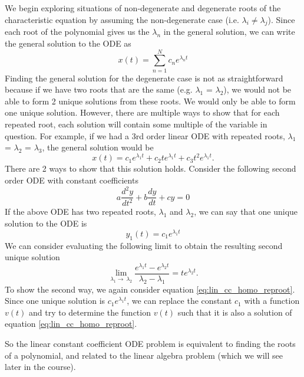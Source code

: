 \documentclass{article}
\newcommand{\be}{\begin{equation}}
\newcommand{\ee}{\end{equation}}
\begin{document}
We begin exploring situations of non-degenerate and degenerate roots of the characteristic equation by assuming the non-degenerate case (i.e. $\lambda_i \neq \lambda_j$).
Since each root of the polynomial gives us the $\lambda_n$ in the general solution, we can write the general solution to the ODE as
\be
x(t) = \sum_{n=1}^N c_n e^{\lambda_n t}
\ee
Finding the general solution for the degenerate case is not as straightforward because if we have two roots that are the same (e.g. $\lambda_1$ = $\lambda_2$), we would not be able to form 2 unique solutions from these roots.
We would only be able to form one unique solution.
However, there are multiple ways to show that for each repeated root, each solution will contain some multiple of the variable in question.
For example, if we had a 3rd order linear ODE with repeated roots, $\lambda_1$ = $\lambda_2$ = $\lambda_3$, the general solution would be
\be
x(t) = c_1 e^{\lambda_1 t} + c_2 t e^{\lambda_1 t} + c_3 t^2 e^{\lambda_1 t} .
\ee
There are 2 ways to show that this solution holds.
Consider the following second order ODE with constant coefficients
\be \label{eq:lin_cc_homo_reproot}
a\frac{d^2 y}{dt^2} + b\frac{d y}{dt} + cy = 0
\ee
If the above ODE has two repeated roots, $\lambda_1$ and $\lambda_2$, we can say that one unique solution to the ODE is
\be
y_1(t) = c_1 e^{\lambda_1 t}
\ee
We can consider evaluating the following limit to obtain the resulting second unique solution
\be
\lim_{\lambda_1\to\ \lambda_2} \frac{e^{\lambda_1 t} - e^{\lambda_2 t}}{\lambda_2 - \lambda_1} = t e^{\lambda_2 t} .
\ee
To show the second way, we again consider equation \ref{eq:lin_cc_homo_reproot}.
Since one unique solution is $c_1 e^{\lambda_1 t}$, we can replace the constant $c_1$ with a function $v(t)$ and try to determine the function $v(t)$ such that it is also a solution of equation \ref{eq:lin_cc_homo_reproot}.

So the linear constant coefficient ODE problem is equivalent to finding the roots of a polynomial, and related to the linear algebra problem (which we will see later in the course).
\end{document}
